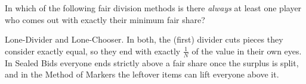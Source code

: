 \documentclass[12pt]{ximera}
\begin{document}
\begin{problem}
In which of the following fair division methods is there \emph{always} at least one
player who comes out with exactly their minimum fair share?

\begin{selectAll}
\end{selectAll}

\begin{feedback}
Lone-Divider and Lone-Chooser. In both, the (first) divider cuts pieces they consider
exactly equal, so they end with exactly $\frac1N$ of the value in their own eyes. In
Sealed Bids everyone ends strictly above a fair share once the surplus is split, and in
the Method of Markers the leftover items can lift everyone above it.
\end{feedback}
\end{problem}
\end{document}
